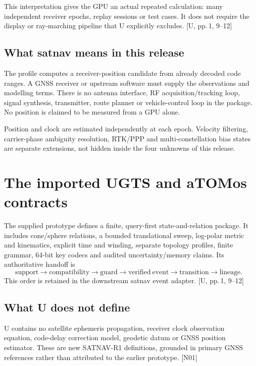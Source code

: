\documentclass[11pt,a4paper]{article}
\newcommand{\src}[1]{\textcolor{muted}{[U, #1]}}
\newcommand{\dec}[1]{\textcolor{accent}{[N#1]}}
\begin{document}
This interpretation gives the GPU an actual repeated calculation: many independent
receiver epochs, replay sessions or test cases. It does not require the display or
ray-marching pipeline that U explicitly excludes. \src{pp.\,1, 9--12}

\subsection*{What satnav means in this release}
The profile computes a receiver-position candidate from already decoded code ranges.
A GNSS receiver or upstream software must supply the observations and modelling terms.
There is no antenna interface, RF acquisition/tracking loop, signal synthesis,
transmitter, route planner or vehicle-control loop in the package. No position is
claimed to be measured from a GPU alone.

Position and clock are estimated independently at each epoch. Velocity filtering,
carrier-phase ambiguity resolution, RTK/PPP and multi-constellation bias states are
separate extensions, not hidden inside the four unknowns of this release.
\clearpage
\tableofcontents
\clearpage



\section{The imported UGTS and aTOMos contracts}
The supplied prototype defines a finite, query-first state-and-relation package. It
includes cone/sphere relations, a bounded translational sweep, log-polar metric and
kinematics, explicit time and winding, separate topology profiles, finite grammar,
64-bit key codecs and audited uncertainty/memory claims. Its authoritative handoff is
\begin{equation}
\mathrm{support}\to\mathrm{compatibility}\to\mathrm{guard}\to\mathrm{verified\ event}
\to\mathrm{transition}\to\mathrm{lineage}.
\end{equation}
This order is retained in the downstream satnav event adapter. \src{pp.\,1, 9--12}

\subsection{What U does not define}
U contains no satellite ephemeris propagation, receiver clock observation equation,
code-delay correction model, geodetic datum or GNSS position estimator. These are
new SATNAV-R1 definitions, grounded in primary GNSS references rather than attributed
to the earlier prototype. \dec{01}
\end{document}
